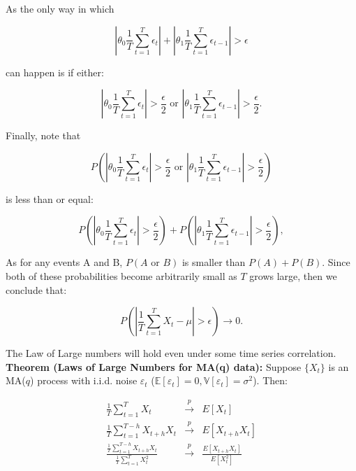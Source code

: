 \documentclass[12] {article}
\begin{document}
As the only way in which 

\[\left |  \theta_0\frac{1}{T}\sum_{t=1}^{T}  \epsilon_t \right |  +\left | \theta_1 \frac{1}{T} \sum_{t=1}^{T} \epsilon_{t-1} \right| > \epsilon\]

\noindent can happen is if either:

\[\left |\theta_0 \frac{1}{T}\sum_{t=1}^{T}  \epsilon_t \right | > \frac{\epsilon}{2}  \textrm {    or  } \left |\theta_1 \frac{1}{T} \sum_{t=1}^{T} \epsilon_{t-1} \right| > \frac{\epsilon}{2}.\] 

\noindent Finally, note that 

\[ P \left( \left |\theta_0 \frac{1}{T}\sum_{t=1}^{T}  \epsilon_t \right | > \frac{\epsilon}{2}  \textrm {    or  } \left |\theta_1 \frac{1}{T} \sum_{t=1}^{T} \epsilon_{t-1} \right| > \frac{\epsilon}{2} \right)  \]

is less than or equal:

\[ P \left( \left |\theta_0 \frac{1}{T}\sum_{t=1}^{T}  \epsilon_t \right | > \frac{\epsilon}{2} \right) +  P \left( \left |\theta_1 \frac{1}{T} \sum_{t=1}^{T} \epsilon_{t-1} \right| > \frac{\epsilon}{2} \right),  \]

\noindent As for any events A and B, $P(A \textrm{ or } B)$ is smaller than $P(A) + P(B)$. Since both of these probabilities become arbitrarily small as $T$ grows large, then we conclude that:

\[ P \left( \left | \frac{1}{T} \sum_{t=1}^{T} X_t -\mu \right| > \epsilon \right) \rightarrow 0. \]

 The Law of Large numbers will hold even under some time series correlation. \\



\noindent \textbf{Theorem (Laws of Large Numbers for MA(q) data):} Suppose $\{X_t\}$ is an MA($q$) process with i.i.d. noise $\varepsilon_{t}$ ($\mathbb{E}[\varepsilon_{t}] = 0, \mathbb{V}[\varepsilon_{t}] = \sigma^2 $). Then:

\begin{eqnarray*}
\frac{1}{T} \sum_{t=1}^{T} X_t &\overset{p}{\rightarrow}& E[X_t] \\
\frac{1}{T} \sum_{t=1}^{T-h} X_{t+h} X_{t} &\overset{p}{\rightarrow}& E[X_{t+h} X_t] \\
\frac{\frac{1}{T} \sum_{t=1}^{T-h} X_{t+h} X_{t}}{\frac{1}{T} \sum_{t=1}^{T} X^2_{t}} &\overset{p}{\rightarrow}& \frac{E[X_{t+h} X_t]}{E[X_t^2]} 
\end{eqnarray*}
\end{document}
